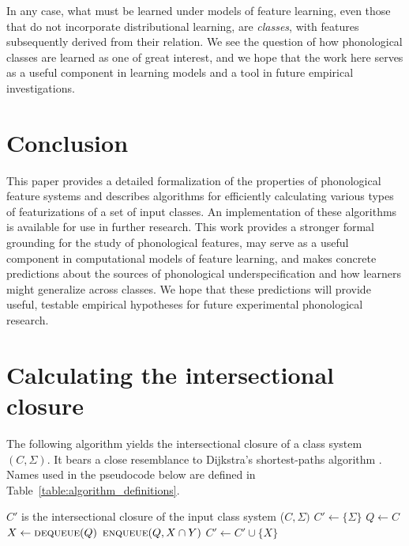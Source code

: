 \documentclass[12pt, oneside]{article}   	%
\begin{document}
In any case, what must be learned under models of feature learning, even those that do not incorporate distributional learning, are \textit{classes}, with features subsequently derived from their relation. We see the question of how phonological classes are learned as one of great interest, and we hope that the work here serves as a useful component in learning models and a tool in future empirical investigations.

\FloatBarrier
\section{Conclusion}
\label{sec:conclusion}

This paper provides a detailed formalization of the properties of phonological feature systems and describes algorithms for efficiently calculating various types of featurizations of a set of input classes. An implementation of these algorithms is available for use in further research. This work provides a stronger formal grounding for the study of phonological features, may serve as a useful component in computational models of feature learning, and makes concrete predictions about the sources of phonological underspecification and how learners might generalize across classes. We hope that these predictions will provide useful, testable empirical hypotheses for future experimental phonological research.

\appendix

\section{Calculating the intersectional closure}
\label{app:closure}
The following algorithm yields the intersectional closure of a class system $(C, \Sigma)$. It bears a close resemblance to Dijkstra's shortest-paths algorithm \cite{Dijkstra1959}. Names used in the pseudocode below are defined in Table~\ref{table:algorithm_definitions}.

\noindent \begin{algorithmic}
	\singlespacing
	\ENSURE $C'$ is the intersectional closure of the input class system ($C, \Sigma)$
	\STATE
	\STATE $C' \leftarrow \{ \Sigma \} $
	\STATE $Q \leftarrow C$
	\STATE
	\STATE $X \leftarrow \textsc{dequeue}(Q)$
	\STATE $\textsc{enqueue}(Q, X \cap Y)$
	\ENDFOR
	\STATE $C' \leftarrow C' \cup \{ X \}$
	\ENDIF
	\ENDWHILE
\end{algorithmic}
\doublespacing
\end{document}
